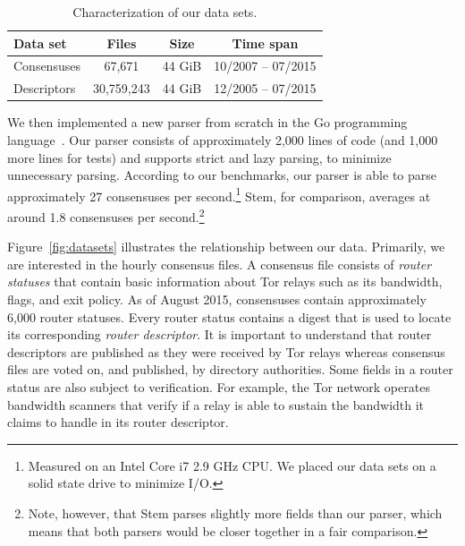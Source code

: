 \begin{table}[t]
\centering
\begin{tabular}{l c c c}
\textbf{Data set} & \textbf{Files} & \textbf{Size} & \textbf{Time span} \\
\hline
Consensuses & 67,671 & 44 GiB & 10/2007 -- 07/2015 \\
Descriptors & 30,759,243 & 44 GiB & 12/2005 -- 07/2015 \\
\end{tabular}
\caption{Characterization of our data sets.}
\label{tab:datasets}
\end{table}

We then implemented a new parser from scratch in the Go programming
language~\cite{zoossh}.  Our parser consists of approximately 2,000 lines of
code (and 1,000 more lines for tests) and supports strict and lazy parsing, to
minimize unnecessary parsing.  According to our benchmarks, our parser is able
to parse approximately 27 consensuses per second.\footnote{Measured on an Intel
Core i7 2.9 GHz CPU.  We placed our data sets on a solid state drive to
minimize I/O.}  Stem, for comparison, averages at around 1.8 consensuses per
second.\footnote{Note, however, that Stem parses slightly more fields than our
parser, which means that both parsers would be closer together in a fair
comparison.}

Figure~\ref{fig:datasets} illustrates the relationship between our data.
Primarily, we are interested in the hourly consensus files.  A consensus file
consists of \emph{router statuses} that contain basic information about Tor
relays such as its bandwidth, flags, and exit policy.  As of August 2015,
consensuses contain approximately 6,000 router statuses.  Every router status
contains a digest that is used to locate its corresponding \emph{router
descriptor}.  It is important to understand that router descriptors are
published as they were received by Tor relays whereas consensus files are voted
on, and published, by directory authorities.  Some fields in a router status
are also subject to verification.  For example, the Tor network operates
bandwidth scanners that verify if a relay is able to sustain the bandwidth it
claims to handle in its router descriptor.

